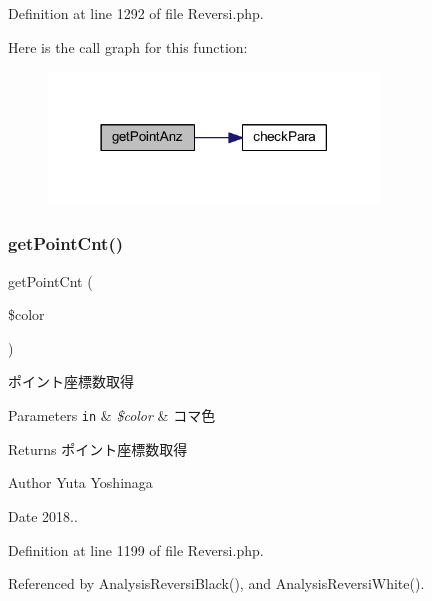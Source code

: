 Definition at line 1292 of file Reversi.\+php.

Here is the call graph for this function\+:
\nopagebreak
\begin{figure}[H]
\begin{center}
\leavevmode
\includegraphics[width=249pt]{class_reversi_af1a30d438a7d17f31353b9d4bfe9cb65_cgraph}
\end{center}
\end{figure}
\mbox{\label{class_reversi_af538d04718f177f71461f582f3bd8eba}} 
\subsubsection{\texorpdfstring{get\+Point\+Cnt()}{getPointCnt()}}
{\footnotesize\ttfamily get\+Point\+Cnt (\begin{DoxyParamCaption}\item[{}]{\$color }\end{DoxyParamCaption})}



ポイント座標数取得 


\begin{DoxyParams}[1]{Parameters}
\mbox{\tt in}  & {\em \$color} & コマ色 \\
\hline
\end{DoxyParams}
\begin{DoxyReturn}{Returns}
ポイント座標数取得 
\end{DoxyReturn}
\begin{DoxyAuthor}{Author}
Yuta Yoshinaga 
\end{DoxyAuthor}
\begin{DoxyDate}{Date}
2018.. 
\end{DoxyDate}


Definition at line 1199 of file Reversi.\+php.



Referenced by Analysis\+Reversi\+Black(), and Analysis\+Reversi\+White().

